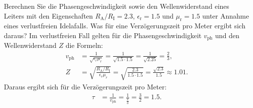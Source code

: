 \documentclass[ngerman]{scrartcl}
\theoremstyle{definition}
\begin{document}
		\begin{voraufgabe}{Berechnen Sie die Phasengeschwindigkeit sowie den Wellenwiderstand eines Leiters mit den Eigenschaften $R_\mathrm{A}/R_\mathrm{I} = 2.3$, $\epsilon_\mathrm{r} = 1.5$ und $\mu_\mathrm{r} = 1.5$ unter Annahme eines verlustfreien Idelafalls. Was für eine Verzögerungszeit pro Meter ergibt sich daraus?}
			Im verlustfreien Fall gelten für die Phasengeschwindigkeit $v_\mathrm{ph}$ und den Wellenwiderstand $Z$ die Formeln:
			\begin{align*}
				v_\mathrm{ph} &= \frac{1}{\sqrt{\epsilon_r \mu_r}} = \frac{1}{\sqrt{1.5 \cdot 1.5}} = \frac{1}{\sqrt{2.25}} = \frac{2}{3},\\
				Z &= \sqrt{\frac{R_\mathrm{A}/R_\mathrm{I}}{\epsilon_r \mu_r}} = \sqrt{\frac{2.3}{1.5 \cdot 1.5}} = \frac{\sqrt{2.3}}{1.5} \approx 1.01.
			\end{align*}
			Daraus ergibt sich für die Verzögerungszeit pro Meter:
			\begin{align*}
				\tau &= \frac{1}{v_\mathrm{ph}} = \frac{1}{\frac{2}{3}} = \frac{3}{2} =1.5.
			\end{align*}
			
		\end{voraufgabe}
\end{document}
